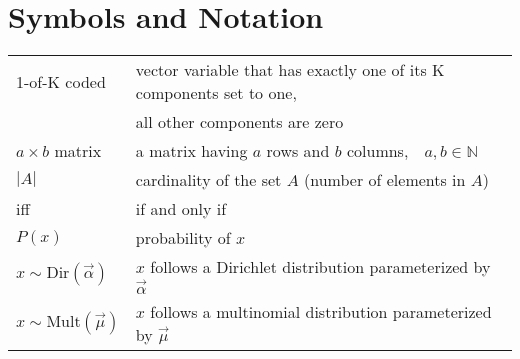 \section*{Symbols and Notation}

\begin{tabular}{ll}
1-of-K coded & vector variable that has exactly one of its K components set to one,\\ & all other components are zero\\
$a \times b$ matrix & a matrix having $a$ rows and $b$ columns,\ \ $a, b \in \mathbb{N}$\\
$|A|$ & cardinality of the set $A$ (number of elements in $A$)\\
iff & if and only if\\
$P(x)$ & probability of $x$\\
$x \sim \text{Dir}(\vec \alpha)$ & $x$ follows a Dirichlet distribution parameterized by $\vec \alpha$\\
$x \sim \text{Mult}(\vec \mu)$ & $x$ follows a multinomial distribution parameterized by $\vec \mu$
\end{tabular}
